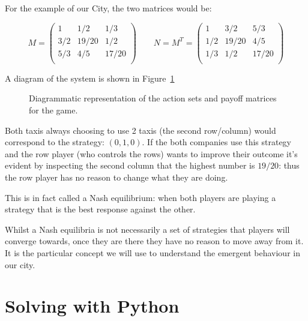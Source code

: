 For the example of our City, the two matrices would be:

\[
   M =
        \begin{pmatrix}
            1     & 1 / 2   & 1 / 3 \\
            3 / 2 & 19 / 20 & 1 / 2 \\
            5 / 3 & 4 / 5   & 17 / 20\\
        \end{pmatrix}
   \qquad
   N = M ^T =
        \begin{pmatrix}
            1     & 3 / 2   & 5 / 3 \\
            1 / 2 & 19 / 20 & 4 / 5 \\
            1 / 3 & 1 / 2   & 17 / 20\\
        \end{pmatrix}
\]

A diagram of the system is shown in Figure~\ref{fig:taxi-firm-game}

\begin{figure}
\begin{center}

\end{center}
\caption{Diagrammatic representation of the action sets and payoff matrices for
    the game.}
\label{fig:taxi-firm-game}
\end{figure}

Both taxis always choosing to use 2 taxis (the second row/column) would
correspond to the strategy: \((0, 1, 0)\).
If the both companies use this strategy and the row player (who controls the
rows) wants to
improve their outcome it's evident by inspecting the second column that the
highest number is \(19 / 20\): thus the row player has no reason to change what
they are doing.

This is in fact called a Nash equilibrium: when both players are playing a
strategy that is the best response against the other.

Whilst a Nash equilibria is not necessarily a set of strategies that players
will converge towards, once they are there they have no reason to move away from
it. It is the particular concept we will use to understand the emergent
behaviour in our city.

\section{Solving with Python}\label{sec:solving-with-python}

